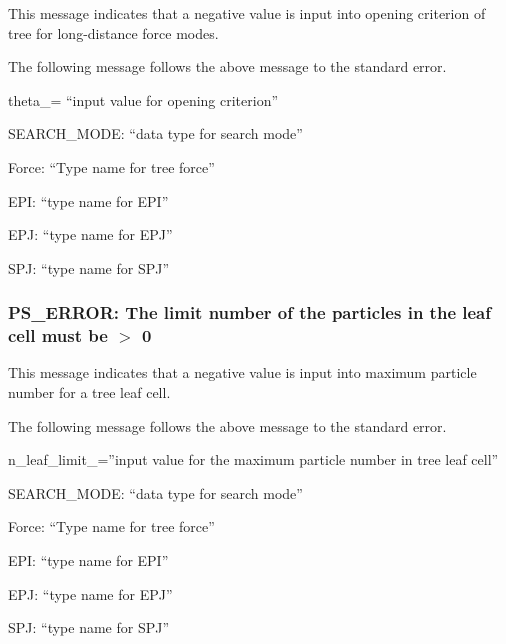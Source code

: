 This message indicates that a negative value is input into opening
criterion of tree for long-distance force modes.

The following message follows the above message to the standard
error.

\begin{screen}
  theta\_= ``input value for opening criterion''

  SEARCH\_MODE: ``data type for search mode''

  Force: ``Type name for tree force''

  EPI: ``type name for EPI''

  EPJ: ``type name for EPJ''

  SPJ: ``type name for SPJ''
  
\end{screen}

\subsubsection{PS\_ERROR: The limit number of the particles in the leaf cell must be $>$ 0}

This message indicates that a negative value is input into maximum
particle number for a tree leaf cell.

The following message follows the above message to the standard error.

\begin{screen}
  n\_leaf\_limit\_=''input value for the maximum particle number in tree leaf cell''

  SEARCH\_MODE: ``data type for search mode''

  Force: ``Type name for tree force''

  EPI: ``type name for EPI''

  EPJ: ``type name for EPJ''

  SPJ: ``type name for SPJ''
  
\end{screen}

